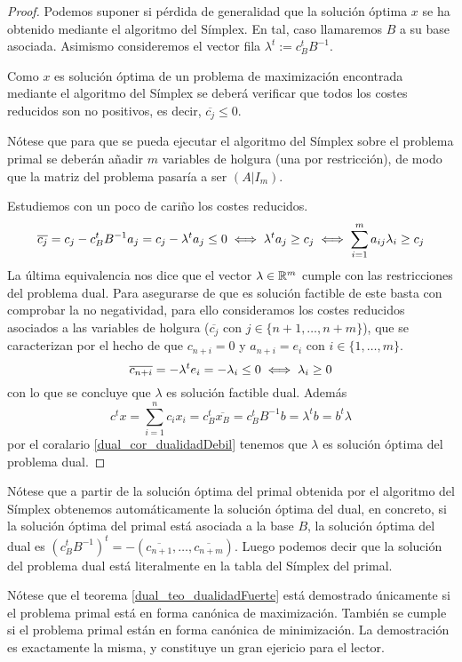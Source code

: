 \begin{proof}
	Podemos suponer si pérdida de generalidad que la solución óptima $x$ se ha obtenido mediante el algoritmo del Símplex. En tal, caso llamaremos $B$ a su base asociada. Asimismo consideremos el vector fila $\lambda^t:=c_B^tB^{-1}$.
	
	Como $x$ es solución óptima de un problema de maximización encontrada mediante el algoritmo del Símplex se deberá verificar que todos los costes reducidos son no positivos, es decir, $\overline{c_j}\leq 0$.
	
	Nótese que para que se pueda ejecutar el algoritmo del Símplex sobre el problema primal se deberán añadir $m$ variables de holgura (una por restricción), de modo que la matriz del problema pasaría a ser $(A|I_m)$.
	
	Estudiemos con un poco de cariño los costes reducidos.
	\begin{equation*}
		\overline{c_j}=c_j-c_B^tB^{-1}a_j=c_j-\lambda^ta_j\leq 0\iff \lambda^ta_j\geq c_j\iff \sum_{i=1}^{m}a_{ij}\lambda_i\geq c_j
	\end{equation*}
	La última equivalencia nos dice que el vector $\lambda\in\mathbb{R}^m$ cumple con las restricciones del problema dual. Para asegurarse de que es solución factible de este basta con comprobar la no negatividad, para ello consideramos los costes reducidos asociados a las variables de holgura ($\overline{c_j}$ con $j\in\{n+1,\dots,n+m\}$), que se caracterizan por el hecho de que $c_{n+i}=0$ y $a_{n+i}=e_i$ con $i\in\{1,\dots,m\}$.
	\begin{equation*}
		\overline{c_{n+i}}=-\lambda^te_i=-\lambda_i\leq 0\iff\lambda_i\geq 0 
	\end{equation*}
	con lo que se concluye que $\lambda$ es solución factible dual. Además
	\begin{equation*}
		c^tx=\sum_{i=1}^{n}c_ix_i=c_B^t\overline{x_B}=c_B^tB^{-1}b=\lambda^tb=b^t\lambda
	\end{equation*}
	por el coralario \ref{dual_cor_dualidadDebil} tenemos que $\lambda$ es solución óptima del problema dual.
\end{proof}
\begin{obs}[Construcción]
	Nótese que a partir de la solución óptima del primal obtenida por el algoritmo del Símplex obtenemos automáticamente la solución óptima del dual, en concreto, si la solución óptima del primal está asociada a la base $B$, la solución óptima del dual es $(c_B^tB^{-1})^t=-(\overline{c_{n+1}},\dots,\overline{c_{n+m}})$. Luego podemos decir que la solución del problema dual está literalmente en la tabla del Símplex del primal.
\end{obs}
Nótese que el teorema \ref{dual_teo_dualidadFuerte} está demostrado únicamente si el problema primal está en forma canónica de maximización. También se cumple si el problema primal están en forma canónica de minimización. La demostración es exactamente la misma, y constituye un gran ejericio para el lector.

